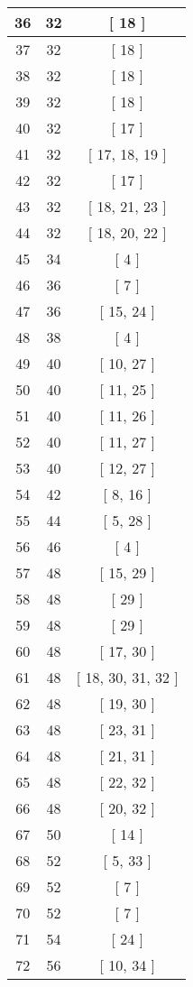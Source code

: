 \begin{center}
\begin{longtable}[H]{|| c c c ||}
36 & 32 & [ 18 ] \\ 
\hline
37 & 32 & [ 18 ] \\ 
\hline
38 & 32 & [ 18 ] \\ 
\hline
39 & 32 & [ 18 ] \\ 
\hline
40 & 32 & [ 17 ] \\ 
\hline
41 & 32 & [ 17, 18, 19 ] \\ 
\hline
42 & 32 & [ 17 ] \\ 
\hline
43 & 32 & [ 18, 21, 23 ] \\ 
\hline
44 & 32 & [ 18, 20, 22 ] \\ 
\hline
45 & 34 & [ 4 ] \\ 
\hline
46 & 36 & [ 7 ] \\ 
\hline
47 & 36 & [ 15, 24 ] \\ 
\hline
48 & 38 & [ 4 ] \\ 
\hline
49 & 40 & [ 10, 27 ] \\ 
\hline
50 & 40 & [ 11, 25 ] \\ 
\hline
51 & 40 & [ 11, 26 ] \\ 
\hline
52 & 40 & [ 11, 27 ] \\ 
\hline
53 & 40 & [ 12, 27 ] \\ 
\hline
54 & 42 & [ 8, 16 ] \\ 
\hline
55 & 44 & [ 5, 28 ] \\ 
\hline
56 & 46 & [ 4 ] \\ 
\hline
57 & 48 & [ 15, 29 ] \\ 
\hline
58 & 48 & [ 29 ] \\ 
\hline
59 & 48 & [ 29 ] \\ 
\hline
60 & 48 & [ 17, 30 ] \\ 
\hline
61 & 48 & [ 18, 30, 31, 32 ] \\ 
\hline
62 & 48 & [ 19, 30 ] \\ 
\hline
63 & 48 & [ 23, 31 ] \\ 
\hline
64 & 48 & [ 21, 31 ] \\ 
\hline
65 & 48 & [ 22, 32 ] \\ 
\hline
66 & 48 & [ 20, 32 ] \\ 
\hline
67 & 50 & [ 14 ] \\ 
\hline
68 & 52 & [ 5, 33 ] \\ 
\hline
69 & 52 & [ 7 ] \\ 
\hline
70 & 52 & [ 7 ] \\ 
\hline
71 & 54 & [ 24 ] \\ 
\hline
72 & 56 & [ 10, 34 ] \\ 

\end{longtable}
\end{center}

